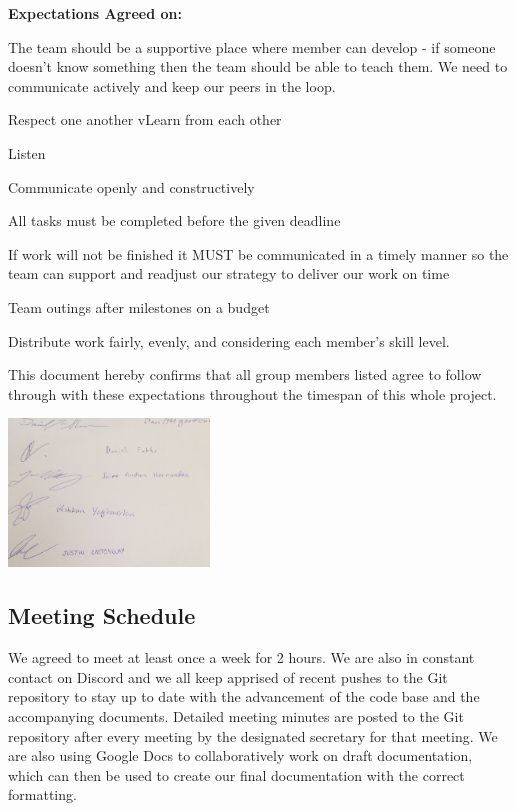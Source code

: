 \documentclass[a4paper]{article}
\begin{document}
\textbf{Expectations Agreed on:}
\begin{compactitem}
\item The team should be a supportive place where member can develop - if someone doesn’t know something then the team should be able to teach them. We need to communicate actively and keep our peers in the loop.
\item Respect one another
vLearn from each other
\item Listen 
\item Communicate openly and constructively
\item All tasks must be completed before the given deadline
\item If work will not be finished it MUST be communicated in a timely manner so the team can support and readjust our strategy to deliver our work on time
\item Team outings after milestones on a budget
\item Distribute work fairly, evenly, and considering each member’s skill level.
\end{compactitem}
\bigskip

This document hereby confirms that all group members listed agree to follow through with these expectations throughout the timespan of this whole project. 


\begin{center}
\includegraphics[width=0.4\textwidth]{ExpectationSignatures.jpg}
\end{center}

\subsection{Meeting Schedule}

We agreed to meet at least once a week for 2 hours. We are also in constant contact on Discord and we all keep apprised of recent pushes to the Git repository to stay up to date with the advancement of the code base and the accompanying documents. Detailed meeting minutes are posted to the Git repository after every meeting by the designated secretary for that meeting. We are also using Google Docs to collaboratively work on draft documentation, which can then be used to create our final documentation with the correct formatting.
\end{document}
